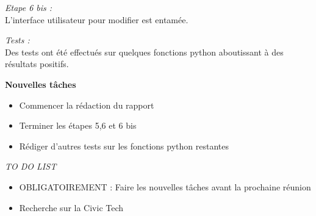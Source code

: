 \vskip 0.25cm

\noindent
\textit{Etape 6 bis :}\\
L’interface utilisateur pour modifier est entamée.

\vskip 0.25cm

\noindent
\textit{Tests :}\\
Des tests ont été effectués sur quelques fonctions python aboutissant à des résultats positifs. 

\vskip 0.25cm

\noindent
\textbf{Nouvelles tâches}
\begin{itemize}
    \item Commencer la rédaction du rapport
    \item Terminer les étapes 5,6 et 6 bis
    \item Rédiger d'autres tests sur les fonctions python restantes
\end{itemize}

\vskip 0.75cm
\noindent
\textit{TO DO LIST}
\vskip 0.25cm

\begin{itemize}
    \item OBLIGATOIREMENT : Faire les nouvelles tâches avant la prochaine réunion 
    \item Recherche sur la Civic Tech
\end{itemize}